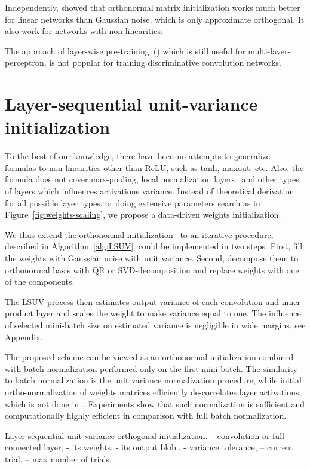 \documentclass{article} \clearpage{}\usepackage{iclr2016_conference,times}
\newcommand{\algrule}[1][.2pt]{\par\vskip.5\baselineskip\hrule height #1\par\vskip.5\baselineskip}
\begin{document}
Independently, \cite{OrthoNorm2013} showed that orthonormal matrix initialization works much better for linear networks than Gaussian noise, which is only approximate orthogonal. It also work for networks with non-linearities.

The approach of layer-wise pre-training~(\cite{Bengio2006}) which is still useful for multi-layer-perceptron, is not popular for training discriminative convolution networks. 
\section{Layer-sequential unit-variance initialization}
\label{sec:algorithm}
To the best of our knowledge, there have been no attempts to generalize~\cite{Xavier10} formulas to non-linearities other than ReLU, such as tanh, maxout, etc. Also, the formula does not cover max-pooling, local normalization layers~\cite{AlexNet2012} and other types of layers which influences activations variance.
Instead of theoretical derivation for all possible layer types, or doing extensive parameters search as in Figure~\ref{fig:weights-scaling}, we propose a data-driven weights initialization.

We thus extend the orthonormal initialization~\cite{OrthoNorm2013} to an iterative procedure, described in Algorithm~\ref{alg:LSUV}. \cite{OrthoNorm2013} could be implemented in two steps. First, fill the weights with Gaussian noise with unit variance. Second, decompose them to orthonormal basis with QR or SVD-decomposition and replace weights with one of the components. 

The LSUV process then estimates output variance of each convolution and inner product layer and scales the weight to make variance equal to one. The influence of selected mini-batch size on estimated variance is negligible in wide margins, see Appendix.

The proposed scheme can be viewed as an orthonormal initialization combined with batch normalization performed only on the first mini-batch. The similarity to batch normalization is the unit variance normalization procedure, while initial ortho-normalization of weights matrices efficiently de-correlates layer activations, which is not done in~\cite{BatchNorm2015}. Experiments show that such normalization is sufficient and computationally highly efficient in comparison with full batch normalization.

\begin{algorithm}[b]
\caption{Layer-sequential unit-variance orthogonal initialization.
 -- convolution or full-connected layer,  -  its weights,  - its output blob.,
 - variance tolerance,   -- current trial,  -- max number of trials.}
\label{alg:LSUV}
\end{algorithm}
\end{document}
